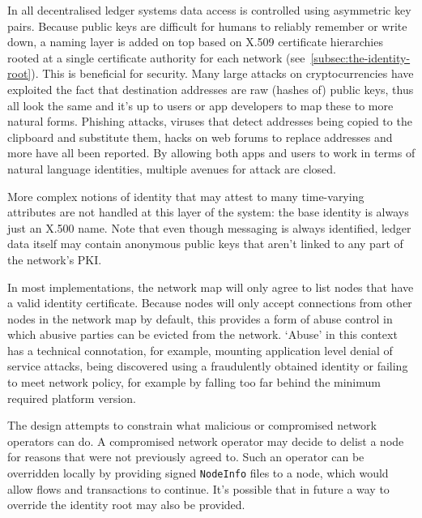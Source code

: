 \documentclass{article}
\begin{document}
In all decentralised ledger systems data access is controlled using asymmetric key pairs. Because public keys are
difficult for humans to reliably remember or write down, a naming layer is added on top based on X.509 certificate
hierarchies rooted at a single certificate authority for each network (see~\cref{subsec:the-identity-root}). This
is beneficial for security. Many large attacks on cryptocurrencies have exploited the fact that destination
addresses are raw (hashes of) public keys, thus all look the same and it's up to users or app developers to map
these to more natural forms. Phishing attacks, viruses that detect addresses being copied to the clipboard and
substitute them, hacks on web forums to replace addresses and more have all been reported. By allowing both
apps and users to work in terms of natural language identities, multiple avenues for attack are closed.

More complex notions of identity that may attest to many time-varying attributes are not handled at this layer of
the system: the base identity is always just an X.500 name. Note that even though messaging is always identified,
ledger data itself may contain anonymous public keys that aren't linked to any part of the network's PKI.

In most implementations, the network map will only agree to list nodes that have a valid identity certificate.
Because nodes will only accept connections from other nodes in the network map by default, this provides a form of
abuse control in which abusive parties can be evicted from the network. `Abuse' in this context has a technical
connotation, for example, mounting application level denial of service attacks, being discovered using a
fraudulently obtained identity or failing to meet network policy, for example by falling too far behind the
minimum required platform version.

The design attempts to constrain what malicious or compromised network operators can do.  A compromised network
operator may decide to delist a node for reasons that were not previously agreed to. Such an operator can be
overridden locally by providing signed \texttt{NodeInfo} files to a node, which would allow flows and transactions
to continue. It's possible that in future a way to override the identity root may also be provided.
\end{document}

